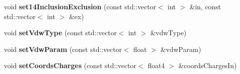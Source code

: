 \begin{DoxyCompactItemize}
void {\bfseries set14\+Inclusion\+Exclusion} (const std\+::vector$<$ int $>$ \&in, const std\+::vector$<$ int $>$ \&ex)
\item 
\hypertarget{classCudaSimulationContext_a466032b2e7f0993d561216ecf4f645d8}{}\label{classCudaSimulationContext_a466032b2e7f0993d561216ecf4f645d8} 
void {\bfseries set\+Vdw\+Type} (const std\+::vector$<$ int $>$ \&vdw\+Type)
\item 
\hypertarget{classCudaSimulationContext_a470df687e207b0c118a1c7491532a40a}{}\label{classCudaSimulationContext_a470df687e207b0c118a1c7491532a40a} 
void {\bfseries set\+Vdw\+Param} (const std\+::vector$<$ float $>$ \&vdw\+Param)
\item 
\hypertarget{classCudaSimulationContext_a75c406ce602e5263c8614700d4da48e4}{}\label{classCudaSimulationContext_a75c406ce602e5263c8614700d4da48e4} 
void {\bfseries set\+Coords\+Charges} (const std\+::vector$<$ float4 $>$ \&coords\+Charges\+In)
\end{DoxyCompactItemize}
